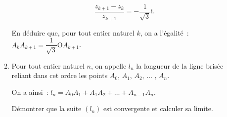 \begin{enumerate}
\begin{enumerate}[label=\alph*.]
          \par
          \[\dfrac{z_{k+1} - z_{k}}{z_{k+1}} = - \dfrac{1}{\sqrt{3}}\text{i}.\]
          \par
          En déduire que, pour tout entier naturel $k$, on a l'égalité~: $A_kA_{k+1} = \dfrac{1}{\sqrt{3}} \text{O}A_{k+1}$.
          \item Pour tout entier naturel $n$, on appelle $l_n$ la longueur de la ligne brisée reliant dans cet ordre les points $A_0$,\: $A_1$,\: $A_2$, $\ldots$ , $A_n$.
          \par
          On a ainsi~: $l_n = A_0A_1 + A_1A_2 + \ldots + A_{n-1}A_n$.
          \par
          Démontrer que la suite $\left(l_n\right)$ est convergente et calculer sa limite.
     \end{enumerate}
\end{enumerate}
